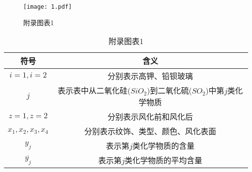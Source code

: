 \begin{figure}[H] 
	\centering 
	\texttt{[image: 1.pdf]} 
	\caption{附录图表1} 
	\label{fig3000} 
\end{figure}


\begin{table}[H]
	\centering
	\caption{附录图表1}
	\begin{tabular}{c c}
		\toprule[1.5pt]
		符号 & 含义  \\ 
		\midrule[1pt]
		$i=1,i=2$ & 分别表示高钾、铅钡玻璃 \\ 
		$j$ & 表示表中从二氧化硅($SiO_2$)到二氧化硫($SO_2$)中第$j$类化学物质 \\
		$z=1,z=2$ & 分别表示风化前和风化后 \\
		$x_1,x_2,x_3,x_4$ & 分别表示纹饰、类型、颜色、风化表面 \\
		$y_j$ & 表示第$j$类化学物质的含量 \\ 
		$\overline{y_j}$ & 表示第$j$类化学物质的平均含量 \\  
		\toprule[1.5pt]
	\end{tabular}
\end{table} 